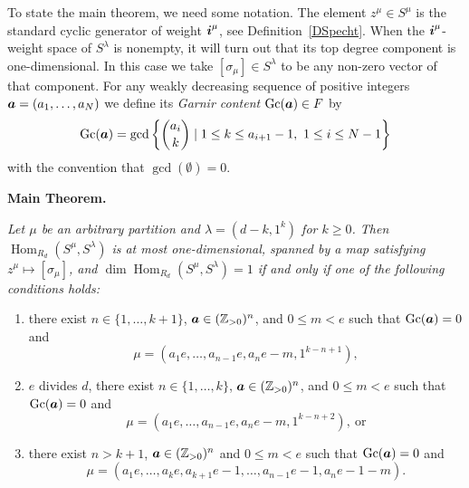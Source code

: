 \documentclass[twoside,11pt,reqno,letter]{amsart}
\numberwithin{equation}{section}
\theoremstyle{definition}  %
\def\bi{\text{\boldmath$i$}}
\def\ba{\text{\boldmath$a$}}
\newcommand{\Hom}{\operatorname{Hom}}
\newcommand{\Gc}{\operatorname{Gc}}
\newcommand{\Z}{\mathbb{Z}}
\newcommand{\0}{{\bar 0}}
\newcommand{\1}{{\bar 1}}
\newcommand{\la}{\lambda}
\newcommand{\si}{\sigma}
\begin{document}

To state the main theorem, we need some notation. The element $z^\mu \in S^\mu$ is the standard cyclic generator of weight $\bi^\mu$, see Definition~\ref{DSpecht}.
When the $\bi^\mu$-weight space of $S^\la$ is nonempty, it will turn out that its top degree component is one-dimensional. In this case we take $[\si_\mu] \in S^\la$ to be any non-zero vector of that component.
For any weakly decreasing sequence of positive integers $\ba = (a_1, \dots, a_N)$ we define its \emph{Garnir content} $\Gc(\ba) \in F$ by
\begin{equation*}%
    \Gc(\ba) = \gcd\left\{ \binom{a_i}{k} \mid 1 \leq k \leq a_{i+1}-1,\ 1 \leq i \leq N-1\right\}
\end{equation*}
with the convention that $\gcd(\emptyset) = 0$. %


\vspace{2mm}
\noindent
{\bf Main Theorem.}
{\em
  Let $\mu$ be an arbitrary partition and $\la = (d-k, 1^k)$ for $k \geq 0$. Then $\Hom_{R_d}(S^\mu, S^\la)$ is at most one-dimensional, spanned by a map satisfying $z^\mu \mapsto [\si_\mu]$, and $\dim \Hom_{R_d}(S^\mu, S^\la) = 1$ if and only if one of the following conditions holds:
  \begin{enumerate}
    \item there exist $n \in \{1, \dots, k+1\}$, $\ba \in (\Z_{>0})^n$, and $0 \leq m < e$ such that $\Gc(\ba) = 0$ and
$$\mu = (a_1 e, \dots, a_{n-1} e, a_n e - m, 1^{k-n+1}),$$
    \item $e$ divides $d$, there exist $n \in \{1, \dots, k\}$, $\ba \in (\Z_{>0})^n$, and $0 \leq m < e$ such that $\Gc(\ba) = 0$ and
$$\mu = (a_1 e, \dots, a_{n-1} e, a_n e - m, 1^{k-n+2}),\ \text{or}$$
    \item there exist $n > k+1$, $\ba \in (\Z_{>0})^n$ and $0 \leq m < e$ such that $\Gc(\ba) = 0$ and
$$\mu = (a_1 e, \dots, a_k e, a_{k+1}e - 1, \dots, a_{n-1} e - 1, a_n e - 1 - m).$$
  \end{enumerate}
}
\end{document}
